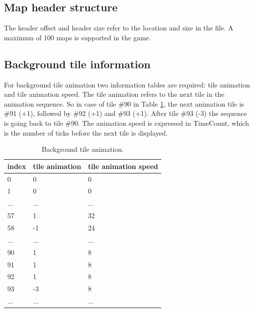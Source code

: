 \documentclass[book.tex]{subfiles}
\begin{document}
\subsection{Map header structure}
The header offset and header size refer to the location and size in the  file. A maximum of 100 maps is supported in the game.\\
\par
\begin{minipage}{\textwidth}
 \par
 \end{minipage}

\subsection{Background tile information}
For background tile animation two information tables are required: tile animation and tile animation speed. The tile animation refers to the next tile in the animation sequence. So in case of tile \#90 in Table \ref{table:background tile anim}, the next animation tile is \#91 (+1), followed by \#92 (+1) and \#93 (+1). After tile \#93 (-3) the sequence is going back to tile \#90. The animation speed is expressed in TimeCount, which is the number of ticks before the next tile is displayed. \\
 \begin{table}[H]
  \begin{tabularx}{\textwidth}[c]{XXX}
  \hline
  \textbf{index} & \textbf{tile animation} & \textbf{tile animation speed}   \\ \hline
  0             & 0          & 0    \\
  1             & 0          & 0    \\
  ...             & ...          & ...    \\
  57             & 1          & 32    \\
  58             & -1          & 24    \\
  ...             & ...          & ...    \\
  90             & 1          & 8    \\
  91            & 1          & 8    \\
  92             & 1          & 8    \\
  93             & -3          & 8    \\
  ...             & ...          & ...    \\
  \end{tabularx}
  \caption{Background tile animation.}
  \label{table:background tile anim}
  \end{table}
\end{document}
